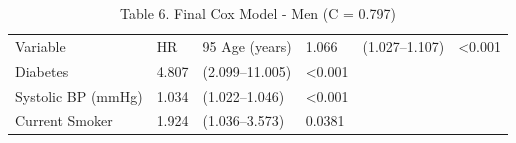 \begin{table}[ht]
\centering
\caption{Table 6. Final Cox Model - Men (C = 0.797)} 
\begin{tabular}{llll}
  \toprule
Variable & HR & 95%
  \midrule
Age (years) & 1.066 & (1.027–1.107) & <0.001 \\ 
  Diabetes & 4.807 & (2.099–11.005) & <0.001 \\ 
  Systolic BP (mmHg) & 1.034 & (1.022–1.046) & <0.001 \\ 
  Current Smoker & 1.924 & (1.036–3.573) & 0.0381 \\ 
   \bottomrule
\end{tabular}
\end{table}
